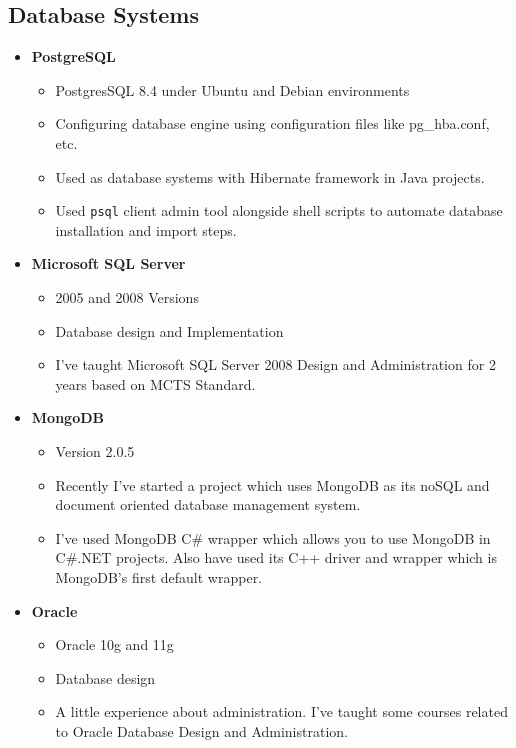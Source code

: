\documentclass[12pt,a4paper]{article}
\begin{document}
	\subsection{Database Systems}
		\begin{itemize}
			\item \textbf{PostgreSQL}
				\begin{itemize}
					\item PostgresSQL 8.4 under Ubuntu and Debian environments
					\item Configuring database engine using configuration files like pg\_hba.conf, etc.
					\item Used as database systems with Hibernate framework in Java projects.
					\item Used \texttt{psql} client admin tool alongside shell scripts to automate database installation and import steps.
				\end{itemize}
			\item \textbf{Microsoft SQL Server}
				\begin{itemize}
					\item 2005 and 2008 Versions
					\item Database design and Implementation
					\item I've taught Microsoft SQL Server 2008 Design and Administration for 2 years based on MCTS Standard.
				\end{itemize}
			\item \textbf{MongoDB}
				\begin{itemize}
					\item Version 2.0.5
					\item Recently I've started a project which uses MongoDB as its noSQL and document oriented database management system.
					\item I've used MongoDB C\# wrapper which allows you to use MongoDB in C\#.NET projects. Also have used its C++ driver and wrapper which is MongoDB's first default wrapper.
				\end{itemize}
			\item \textbf{Oracle}
				\begin{itemize}
					\item Oracle 10g and 11g
					\item Database design
					\item A little experience about administration. I've taught some courses related to Oracle Database Design and Administration.
				\end{itemize}
		\end{itemize}
	
\end{document}
